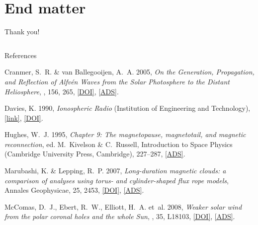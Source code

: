 \documentclass[11pt,aspectratio=1610]{beamer}	%
\begin{document}
\section{End matter}

\begin{frame}[c]{Thank you!}{}
	\begin{columns}[c]
		

	\end{columns}
\end{frame}


\begin{frame}[t,allowframebreaks]{References}
	\tiny
	\begin{thebibliography}{10}
	
		\beamertemplatebookbibitems
		
		\beamertemplatearticlebibitems
		
			{Cranmer}, S.~R. \& {van Ballegooijen}, A.~A. 2005, \emph{{On the Generation,
			Propagation, and Reflection of Alfv{\'e}n Waves from the Solar Photosphere to
			the Distant Heliosphere}}, \apjs, 156, 265,
			\href{http://dx.doi.org/10.1086/426507}{[DOI]},
			\href{http://adsabs.harvard.edu/abs/2005ApJS..156..265C}{[ADS]}.
		
			Davies, K. 1990, \emph{Ionospheric Radio} (Institution of Engineering and
			Technology),
			\href{http://digital-library.theiet.org/content/books/ew/pbew031e}{[link]},
			\href{http://dx.doi.org/10.1049/PBEW031E}{[DOI]}.
		
			{Hughes}, W.~J. 1995, \emph{{Chapter 9: The magnetopause, magnetotail, and
			magnetic reconnection}}, ed. M.~Kivelson \& C.~Russell, Introduction to Space
			Physics (Cambridge University Press, Cambridge), 227--287,
			\href{http://adsabs.harvard.edu/abs/1995isp..book.....K}{[ADS]}.
		
			{Marubashi}, K. \& {Lepping}, R.~P. 2007, \emph{{Long-duration magnetic clouds:
			a comparison of analyses using torus- and cylinder-shaped flux rope models}},
			Annales Geophysicae, 25, 2453,
			\href{http://dx.doi.org/10.5194/angeo-25-2453-2007}{[DOI]},
			\href{http://adsabs.harvard.edu/abs/2007AnGeo..25.2453M}{[ADS]}.
			
			{McComas}, D.~J., {Ebert}, R.~W., {Elliott}, H.~A. {et~al.} 2008{},
			\emph{{Weaker solar wind from the polar coronal holes and the whole Sun}},
			\grl, 35, L18103, \href{http://dx.doi.org/10.1029/2008GL034896}{[DOI]},
			\href{http://adsabs.harvard.edu/abs/2008GeoRL..3518103M}{[ADS]}.
		

\end{thebibliography}
\end{frame}
\end{document}
